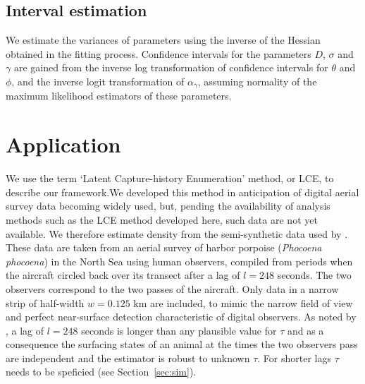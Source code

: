 \documentclass[useAMS, usenatbib, referee]{biom}\usepackage[]{graphicx}\usepackage[]{color}
\begin{document}
\subsection{Interval estimation}
\label{sec:ci}

We estimate the variances of parameters using the inverse of the Hessian obtained in the fitting process. Confidence intervals for the parameters $D$, $\sigma$ and $\gamma$ are gained from the inverse log transformation of confidence intervals for $\theta$ and $\phi$, and the inverse logit transformation of $\alpha_\gamma$, assuming normality of the maximum likelihood estimators of these parameters.


\section{Application \label{sec:applic}}

We use the term `Latent Capture-history Enumeration' method, or LCE, to describe our framework.We  developed this method in anticipation of digital aerial survey data becoming widely used, but, pending the availability of analysis methods such as the LCE method developed here, such data are not yet available. We therefore estimate density from the semi-synthetic data used by \cite{Stevenson+al:18}. These data are taken from an aerial survey of harbor porpoise ({\em Phocoena phocoena}) in the North Sea using human observers, compiled from periods when the aircraft circled back over its transect after a lag of $l=248$ seconds. The two observers correspond to the two passes of the aircraft. Only data in a narrow strip of half-width $w=0.125$ km are included, to mimic the narrow field of view and perfect near-surface detection characteristic of digital observers. As noted by \cite{Stevenson+al:18}, a lag of $l=248$ seconds is longer than any plausible value for $\tau$ and as a consequence the surfacing states of an animal at the times the two observers pass are independent and the estimator is robust to unknown $\tau$. For shorter lags $\tau$ needs to be speficied (see Section~\ref{sec:sim}).

\end{document}
